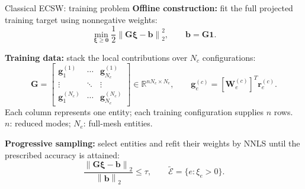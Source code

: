 \documentclass[aspectratio=169]{beamer}
\newcommand{\vect}[1]{\boldsymbol{#1}}
\newcommand{\matr}[1]{\boldsymbol{#1}}
\begin{document}
\begin{frame}{Classical ECSW: training problem}
\small
\setlength{\abovedisplayskip}{3pt}
\setlength{\belowdisplayskip}{3pt}
\setlength{\abovedisplayshortskip}{3pt}
\setlength{\belowdisplayshortskip}{3pt}
\textbf{Offline construction:} fit the full projected training target using nonnegative weights:
\[
  \min_{\vect{\xi}\geq\vect{0}}
  \frac12\left\|\matr{G}\vect{\xi}-\vect{b}\right\|_2^2,
  \qquad \vect{b}=\matr{G}\vect{1}.
\]

\textbf{Training data:} stack the local contributions over $N_c$ configurations:
\[
  \matr{G}=
  \begin{bmatrix}
    \vect{g}_1^{(1)} & \cdots & \vect{g}_{N_e}^{(1)}\\
    \vdots & \ddots & \vdots\\
    \vect{g}_1^{(N_c)} & \cdots & \vect{g}_{N_e}^{(N_c)}
  \end{bmatrix}
  \in\mathbb R^{nN_c\times N_e},
  \qquad
  \vect{g}_e^{(c)}=
  \left[\matr{W}_e^{(c)}\right]^T\vect{r}_e^{(c)}.
\]
{\footnotesize
  Each column represents one entity; each training configuration supplies $n$ rows.\\
  $n$: reduced modes; $N_e$: full-mesh entities.
}

\vspace{0.4em}
\textbf{Progressive sampling:} select entities and refit their weights by NNLS until the prescribed accuracy is attained:
\[
  \frac{\left\|\matr{G}\vect{\xi}-\vect{b}\right\|_2}
       {\left\|\vect{b}\right\|_2}\leq\tau,
  \qquad
  \widetilde{\mathcal E}=\{e:\xi_e>0\}.
\]
\end{frame}
\end{document}
